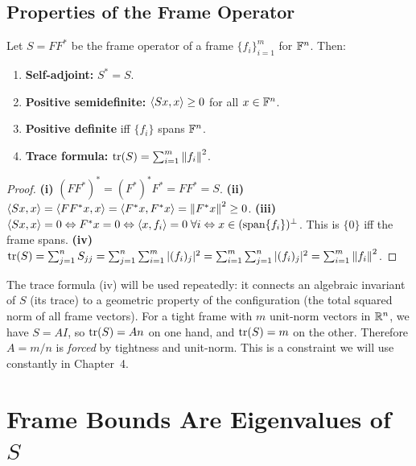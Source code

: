 \subsection{Properties of the Frame Operator}
\label{subsec:frame-op-properties}

\begin{proposition}[Properties of $S$]
\label{prop:frame-op-properties}
Let $S=FF^*$ be the frame operator of a frame $\{f_i\}_{i=1}^m$ for
$\mathbb{F}^n$. Then:
\begin{enumerate}[label=(\roman*)]
  \item \textbf{Self-adjoint:} $S^*=S$.
  \item \textbf{Positive semidefinite:} $\left\langle Sx, x \right\rangle\ge 0$ for all
        $x\in\mathbb{F}^n$.
  \item \textbf{Positive definite} iff $\{f_i\}$ spans $\mathbb{F}^n$.
  \item \textbf{Trace formula:} $\operatorname{tr}(S)=\sum_{i=1}^m\left\| f_i \right\|^2$.
\end{enumerate}
\end{proposition}

\begin{proof}
\textbf{(i)} $(FF^*)^*=(F^*)^*F^*=FF^*=S$.\quad
\textbf{(ii)} $\left\langle Sx, x \right\rangle=\left\langle FF^*x, x \right\rangle=\left\langle F^*x, F^*x \right\rangle
=\left\| F^*x \right\|^2\ge 0$.\quad
\textbf{(iii)} $\left\langle Sx, x \right\rangle=0\Leftrightarrow F^*x=0\Leftrightarrow
\left\langle x, f_i \right\rangle=0\;\forall i\Leftrightarrow
x\in(\operatorname{span}\{f_i\})^\perp$. This is $\{0\}$ iff the frame spans.\quad
\textbf{(iv)} $\operatorname{tr}(S)=\sum_{j=1}^n S_{jj}
=\sum_{j=1}^n\sum_{i=1}^m|(f_i)_j|^2
=\sum_{i=1}^m\sum_{j=1}^n|(f_i)_j|^2=\sum_{i=1}^m\left\| f_i \right\|^2$.
\end{proof}

\begin{remark*}
The trace formula (iv) will be used repeatedly: it connects an algebraic
invariant of $S$ (its trace) to a geometric property of the configuration
(the total squared norm of all frame vectors). For a tight frame with $m$
unit-norm vectors in $\mathbb{R}^n$, we have $S=AI$, so $\operatorname{tr}(S)=An$ on one hand,
and $\operatorname{tr}(S)=m$ on the other. Therefore $A=m/n$ is \emph{forced} by
tightness and unit-norm. This is a constraint we will use constantly in
Chapter~4.
\end{remark*}

\section{Frame Bounds Are Eigenvalues of $S$}
\label{sec:frame-bounds-are-eigenvalues}

